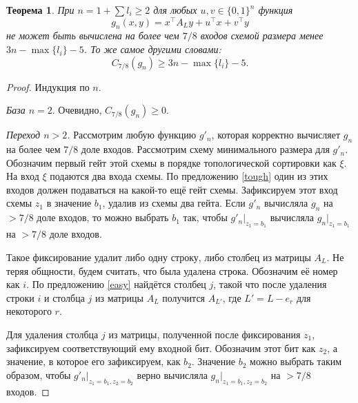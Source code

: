 \documentclass[oneside, a4paper]{article}
\newtheorem{theorem}{Теорема}
\theoremstyle{plain}
\theoremstyle{remark}
\begin{document}
\begin{theorem} \label{main}
При $n = 1 + \sum l_i \geq 2$ для любых $u, v \in \{0, 1\}^n$ функция
\[
g_n(x, y) = x^\top A_L y + u^\top x + v^\top y
\]
не может быть вычислена на более чем $7/8$ входов схемой размера менее $3n -
\max \{l_i\} - 5$. То же самое другими словами:
\[
C_{7/8}(g_n) \geq 3n - \max \{l_i\} - 5.
\]
\end{theorem}
\begin{proof}
Индукция по $n$.

\emph{База $n = 2$}. Очевидно, $C_{7/8}(g_n) \geq 0$.

\emph{Переход $n > 2$.} Рассмотрим любую функцию $g'_n$, которая корректно
вычисляет $g_n$ на более чем $7/8$ доле входов. Рассмотрим схему минимального
размера для $g'_n$. Обозначим первый гейт этой схемы в порядке топологической
сортировки как $\xi$. На вход $\xi$ подаются два входа схемы. По предложению \ref{tough}
один из этих входов должен подаваться на какой-то ещё гейт схемы. Зафиксируем
этот вход схемы $z_1$ в значение $b_1$, удалив из схемы два гейта. Если $g'_n$
вычисляла $g_n$ на $> 7/8$ доле входов, то можно выбрать $b_1$ так, чтобы
$g'_n \rvert_{z_1 = b_1}$ вычисляла $g_n \rvert_{z_1 = b_1}$ на $ > 7/8$ доле входов.

Такое фиксирование удалит либо одну строку, либо столбец из матрицы $A_L$. Не
теряя общности, будем считать, что была удалена строка. Обозначим её номер как
$i$. По предложению \ref{easy} найдётся столбец $j$, такой что после удаления
строки $i$ и столбца $j$ из матрицы $A_L$ получится $A_{L'}$, где $L' = L - e_r$
для некоторого $r$.

Для удаления столбца $j$ из матрицы, полученной после фиксирования $z_1$,
зафиксируем соответствующий ему входной бит. Обозначим этот бит как $z_2$, а
значение, в которое его зафиксируем, как $b_2$. Значение $b_2$ можно выбрать
таким образом, чтобы $g'_n \rvert _ {z_1 = b_1, z_2 = b_2}$ верно вычисляла
$g_n \rvert _ {z_1 = b_1, z_2 = b_2}$ на $> 7/8$ входов.


\end{proof}
\end{document}
